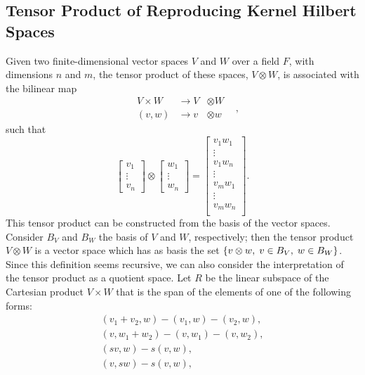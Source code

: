 \subsection{Tensor Product of Reproducing Kernel Hilbert Spaces}
Given two finite-dimensional vector spaces $V$ and $W$ over a field $F$, with dimensions $n$ and $m$, the tensor product of these spaces, $V \otimes W$, is associated with the bilinear map
\begin{equation}
    \nonumber
    \begin{aligned}
         & V \times W & \to V & \otimes W & \\
         & (v, w)     & \to v & \otimes w &
    \end{aligned},
\end{equation}
such that
\begin{equation}
    \nonumber
    \begin{bmatrix}
        v_1    \\
        \vdots \\
        v_n
    \end{bmatrix}
    \otimes
    \begin{bmatrix}
        w_1    \\
        \vdots \\
        w_n
    \end{bmatrix}
    =
    \begin{bmatrix}
        v_1 w_1 \\
        \vdots  \\
        v_1 w_n \\
        \vdots  \\
        v_m w_1 \\
        \vdots  \\
        v_m w_n \\
    \end{bmatrix} .
\end{equation}
This tensor product can be constructed from the basis of the vector spaces. Consider $B_V$ and $B_W$ the basis of $V$ and $W$, respectively; then the tensor product $V \otimes W$ is a vector space which has as basis the set $\left\{v \otimes w, \; v \in B_V, \; w \in B_W\right\}$.
%
Since this definition seems recursive, we can also consider the interpretation of the tensor product as a quotient space.
Let $R$ be the linear subspace of the Cartesian product $V \times W$ that is the span of the elements of one of the following forms:
\begin{align*}
    (v_1 + v_2, w) - (v_1, w) - (v_2, w), \\
    (v, w_1 + w_2) - (v, w_1) - (v, w_2), \\
    (sv, w) - s(v, w),                    \\
    (v, sw) - s(v, w),
\end{align*}

